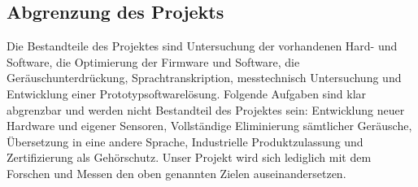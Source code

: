 \documentclass{article}
\begin{document}
\subsection{Abgrenzung des Projekts}


Die Bestandteile des Projektes sind Untersuchung der vorhandenen Hard- und Software, die Optimierung der Firmware und Software, die Geräuschunterdrückung, Sprachtranskription, messtechnisch Untersuchung und Entwicklung einer Prototypsoftwarelösung. 
Folgende Aufgaben sind klar abgrenzbar und werden nicht Bestandteil des Projektes sein:
Entwicklung neuer Hardware und eigener Sensoren, Vollständige Eliminierung sämtlicher Geräusche, Übersetzung in eine andere Sprache, Industrielle Produktzulassung und Zertifizierung als Gehörschutz.
Unser Projekt wird sich lediglich mit dem Forschen und Messen den oben genannten Zielen auseinandersetzen.
\end{document}
